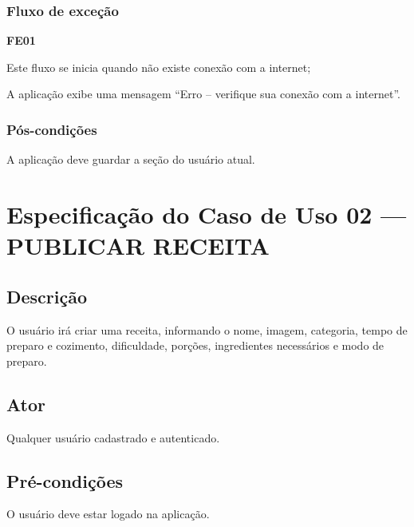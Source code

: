 \subsubsection*{Fluxo de exceção}
\begin{lista}
	\item \textbf{FE01}
	\begin{lista}
		\item Este fluxo se inicia quando não existe conexão com a internet;
		\item A aplicação exibe uma mensagem “Erro – verifique sua conexão com a internet”.
	\end{lista}
\end{lista}

\subsubsection*{Pós-condições}
A aplicação deve guardar a seção do usuário atual.
\pagebreak


\section*{Especificação do Caso de Uso 02 --- PUBLICAR RECEITA}
\subsection*{Descrição}
O usuário irá criar uma receita, informando o nome, imagem, categoria, tempo de preparo e cozimento, dificuldade, porções, ingredientes necessários e modo de preparo.

\subsection*{Ator}
Qualquer usuário cadastrado e autenticado.

\subsection*{Pré-condições}
O usuário deve estar logado na aplicação.


